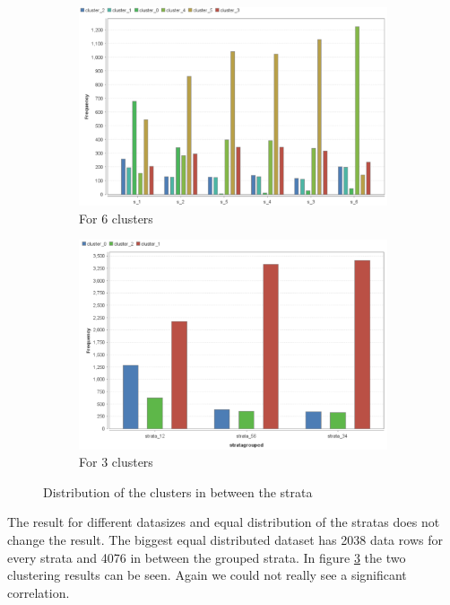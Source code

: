 \begin{figure}[!htbp]
\centering
\begin{subfigure}{0.9\textwidth}
\includegraphics[width=\linewidth]{ClusterOrigRapidDistribution2038eq.PNG}
\caption{For 6 clusters}
\label{fig:2038_6}
\end{subfigure}
\begin{subfigure}{0.9\textwidth}
\includegraphics[width=\linewidth]{ClusterOrigRapidDistribution2038eq2.PNG}
\caption{For 3 clusters}
\label{fig:2038_3}
\end{subfigure}
\caption{Distribution of the clusters in between the strata}
\label{fig:2038_Clust}
\end{figure}

The result for different datasizes and equal distribution of the stratas does not change the result. The biggest equal distributed dataset has 2038 data rows for every strata and 4076 in between the grouped strata. In figure \ref{fig:2038_Clust} the two clustering results can be seen. Again we could not really see a significant correlation.

